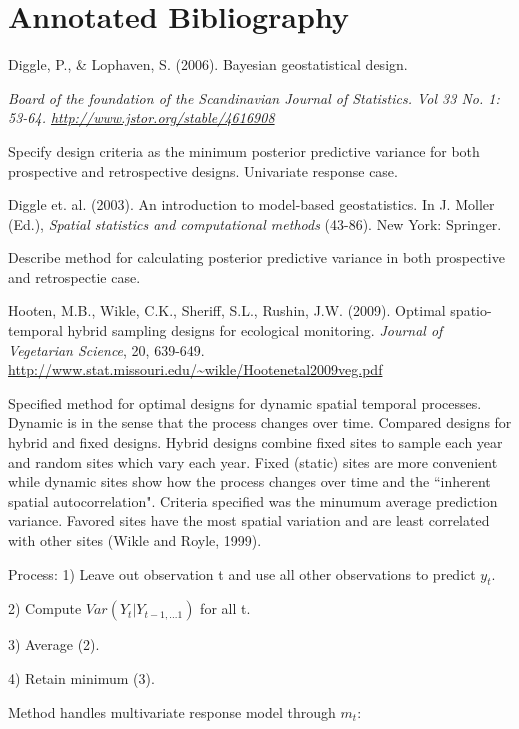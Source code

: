 
\chapter{Annotated Bibliography} %

\label{AnnoBib} %

\hangindent=0.5in Diggle, P., & Lophaven, S. (2006). Bayesian geostatistical design. {\it Board of the foundation of the Scandinavian Journal of Statistics. Vol 33 No. 1: 53-64. \url{http://www.jstor.org/stable/4616908}

Specify design criteria as the minimum posterior predictive variance for both prospective and retrospective designs. Univariate response case. 

\hangindent=0.5in Diggle et. al. (2003). An introduction to model-based geostatistics. In J. Moller (Ed.), {\it Spatial statistics and computational methods} (43-86). New York: Springer.

Describe method for calculating posterior predictive variance in both prospective and retrospectie case.


\hangindent=0.5in Hooten, M.B., Wikle, C.K., Sheriff, S.L., Rushin, J.W. (2009). Optimal spatio-temporal hybrid sampling designs for ecological monitoring. {\it Journal of Vegetarian Science}, 20, 639-649. \url{http://www.stat.missouri.edu/~wikle/Hootenetal2009veg.pdf}

Specified method for optimal designs for dynamic spatial temporal processes. Dynamic is in the sense that the process changes over time. Compared designs for hybrid and fixed designs. Hybrid designs combine fixed sites to sample each year and random sites which vary each year. Fixed (static) sites are more convenient while dynamic sites show how the process changes over time and the ``inherent spatial autocorrelation". Criteria specified was the minumum average prediction variance. Favored sites have the most spatial variation and are least correlated with other sites (Wikle and Royle, 1999).

Process:
1) Leave out observation t and use all other observations to predict $y_{t}$. 

2) Compute $Var(Y_{t} | Y_{t-1,...1})$ for all t.

3) Average (2).

4) Retain minimum (3).

Method handles multivariate response model through $m_{t}$:

}
